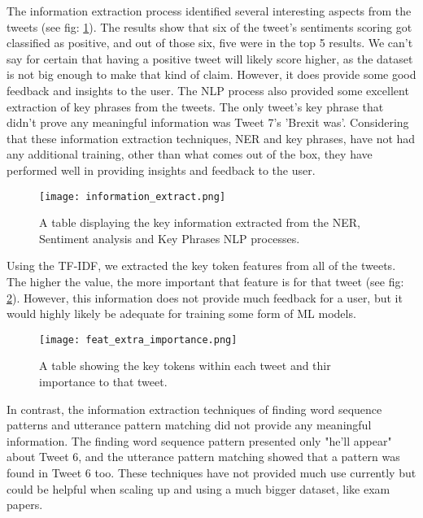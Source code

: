 	The information extraction process identified several interesting aspects from the tweets (see fig: \ref{fig:information_extract}). The results show that six of the tweet's sentiments scoring got classified as positive, and out of those six, five were in the top 5 results. We can't say for certain that having a positive tweet will likely score higher, as the dataset is not big enough to make that kind of claim. However, it does provide some good feedback and insights to the user. The NLP process also provided some excellent extraction of key phrases from the tweets. The only tweet's key phrase that didn't prove any meaningful information was Tweet 7's 'Brexit was'. Considering that these information extraction techniques, NER and key phrases, have not had any additional training, other than what comes out of the box, they have performed well in providing insights and feedback to the user.


	\begin{figure}[h]
		\centering
		\texttt{[image: information\_extract.png]}
		\caption{A table displaying the key information extracted from the NER, Sentiment analysis and Key Phrases NLP processes.}
		\label{fig:information_extract}
		
	\end{figure}

	Using the TF-IDF, we extracted the key token features from all of the tweets. The higher the value, the more important that feature is for that tweet (see fig: \ref{fig:feature_extract}). However, this information does not provide much feedback for a user, but it would highly likely be adequate for training some form of ML models.

	\begin{figure}[h]
		\centering
		\texttt{[image: feat\_extra\_importance.png]}
		\caption{A table showing the key tokens within each tweet and thir importance to that tweet.}
		\label{fig:feature_extract}
		
	\end{figure}

	In contrast, the information extraction techniques of finding word sequence patterns and utterance pattern matching did not provide any meaningful information. The finding word sequence pattern presented only "he'll appear" about Tweet 6, and the utterance pattern matching showed that a pattern was found in Tweet 6 too. These techniques have not provided much use currently but could be helpful when scaling up and using a much bigger dataset, like exam papers.



